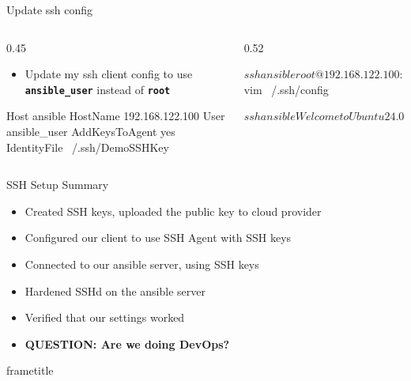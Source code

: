 \documentclass[aspectratio=169,12pt]{beamer}
\begin{document}
\begin{frame}[fragile]{Update ssh config}
\begin{columns}[T]
\begin{column}{0.45\textwidth}
\begin{itemize}
  \item Update my ssh client config to use \textbf{\texttt{ansible\_user}} instead of \textbf{\texttt{root}}
\end{itemize}
\vspace{0.3cm}
\begin{codessh}
Host ansible
    HostName 192.168.122.100
    User ansible_user
    AddKeysToAgent yes
    IdentityFile ~/.ssh/DemoSSHKey
\end{codessh}
\end{column}
\begin{column}{0.52\textwidth}
\begin{termsmall}
$ ssh ansible
root@192.168.122.100: Permission denied
  (publickey).

$ vim ~/.ssh/config

$ ssh ansible
Welcome to Ubuntu 24.04 LTS
...
ansible_user@ansible:~$
\end{termsmall}
\end{column}
\end{columns}
\end{frame}

\begin{frame}{SSH Setup Summary}
\begin{itemize}
  \item Created SSH keys, uploaded the public key to cloud provider
  \item Configured our client to use SSH Agent with SSH keys
  \item Connected to our ansible server, using SSH keys
  \item Hardened SSHd on the ansible server
  \item Verified that our settings worked
  \item \textbf{QUESTION: Are we doing DevOps?}
\end{itemize}
\end{frame}

\begin{frame}[plain]
\vspace{3cm}
\begin{beamercolorbox}[wd=\paperwidth,ht=2.5cm,dp=0.8cm]{frametitle}
\end{beamercolorbox}
\end{frame}
\end{document}
